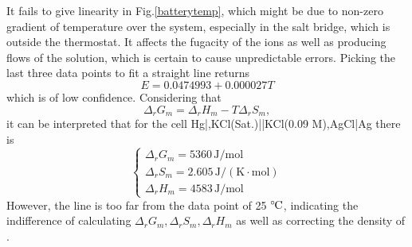 \documentclass[%
 reprint,
 amsmath,amssymb,
 aps,
10.5pt,
]{revtex4-1}
\newcommand{\celsius}{\ensuremath{^\circ\hspace{-0.09em}\mathrm{C}}}
\begin{document}
It fails to give linearity in Fig.\ref{batterytemp}, which might be due to non-zero gradient of temperature over the system, especially in the salt bridge, which is outside the thermostat. It affects the fugacity of the ions as well as producing flows of the solution, which is certain to cause unpredictable errors. Picking the last three data points to fit a straight line returns
\begin{equation}
E = 0.0474993 + 0.000027 T
\end{equation}
which is of low confidence. Considering that
\begin{equation}
\Delta_r G_m = \Delta_r H_m - T\Delta_r S_m,
\end{equation}
it can be interpreted that for the cell Hg|,KCl(Sat.)||KCl(0.09 M),AgCl|Ag there is
\begin{equation}
\begin{cases}
\Delta_r G_m = 5360 \,\mathrm{J/mol}\\
\Delta_r S_m = 2.605 \,\mathrm{J/(K\cdot mol)} \\
\Delta_r H_m = 4583 \,\mathrm{J/mol}
\end{cases}
\end{equation}
However, the line is too far from the data point of 25 \celsius, indicating the indifference of calculating $\Delta_r G_m,\Delta_r S_m,\Delta_r H_m$ as well as correcting the density of .
\end{document}
